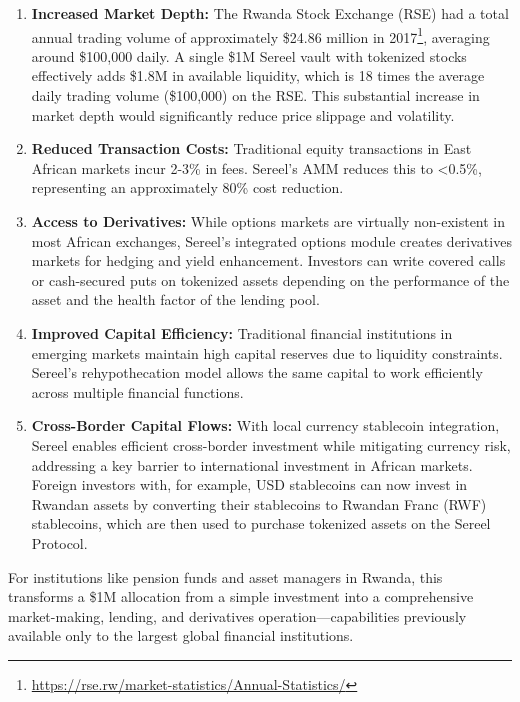 \documentclass[12pt]{article}
\begin{document}
\begin{enumerate}
    \item \textbf{Increased Market Depth:} The Rwanda Stock Exchange (RSE) had a total annual trading volume of approximately \$24.86 million in 2017\footnote{\url{https://rse.rw/market-statistics/Annual-Statistics/}}, averaging around \$100,000 daily. A single \$1M Sereel vault with tokenized stocks effectively adds \$1.8M in available liquidity, which is 18 times the average daily trading volume (\$100,000) on the RSE. This substantial increase in market depth would significantly reduce price slippage and volatility.
  
  \item \textbf{Reduced Transaction Costs:} Traditional equity transactions in East African markets incur 2-3\% in fees. Sereel's AMM reduces this to \textless 0.5\%, representing an approximately 80\% cost reduction.

  \item \textbf{Access to Derivatives:} While options markets are virtually non-existent in most African exchanges, Sereel's integrated options module creates derivatives markets for hedging and yield enhancement. Investors can write covered calls or cash-secured puts on tokenized assets depending on the performance of the asset and the health factor of the lending pool.

  \item \textbf{Improved Capital Efficiency:} Traditional financial institutions in emerging markets maintain high capital reserves due to liquidity constraints. Sereel's rehypothecation model allows the same capital to work efficiently across multiple financial functions.
  
  \item \textbf{Cross-Border Capital Flows:} With local currency stablecoin integration, Sereel enables efficient cross-border investment while mitigating currency risk, addressing a key barrier to international investment in African markets. Foreign investors with, for example, USD stablecoins can now invest in Rwandan assets by converting their stablecoins to Rwandan Franc (RWF) stablecoins, which are then used to purchase tokenized assets on the Sereel Protocol.
\end{enumerate}

For institutions like pension funds and asset managers in Rwanda, this transforms a \$1M allocation from a simple investment into a comprehensive market-making, lending, and derivatives operation—capabilities previously available only to the largest global financial institutions.
\end{document}
